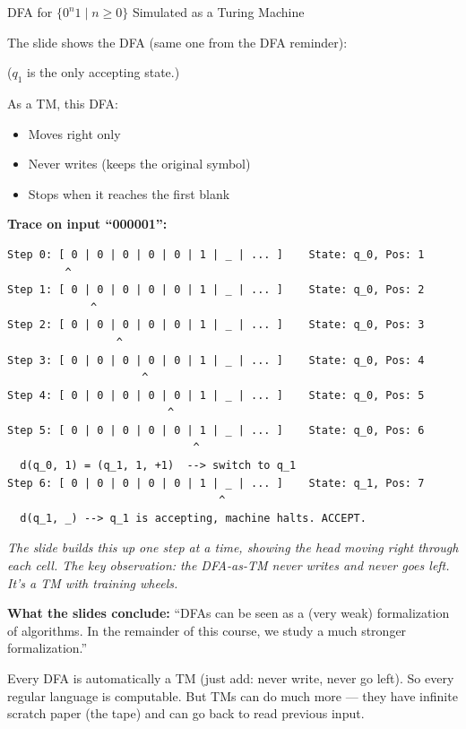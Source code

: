 \documentclass[11pt,a4paper]{article}
\newcommand{\kt}[1]{\par\vspace{0.3em}\colorbox{yellow!60}{\parbox{\dimexpr\linewidth-2\fboxsep}{#1}}\vspace{0.3em}}
\begin{document}
\begin{examplebox}{DFA for $\{0^n 1 \mid n \geq 0\}$ Simulated as a Turing Machine}

The slide shows the DFA (same one from the DFA reminder):
\begin{center}
\end{center}
($q_1$ is the only accepting state.)

As a TM, this DFA:
\begin{itemize}[nosep]
\item Moves right only
\item Never writes (keeps the original symbol)
\item Stops when it reaches the first blank
\end{itemize}

\textbf{Trace on input ``000001'':}

\begin{lstlisting}
Step 0: [ 0 | 0 | 0 | 0 | 0 | 1 | _ | ... ]    State: q_0, Pos: 1
         ^
Step 1: [ 0 | 0 | 0 | 0 | 0 | 1 | _ | ... ]    State: q_0, Pos: 2
             ^
Step 2: [ 0 | 0 | 0 | 0 | 0 | 1 | _ | ... ]    State: q_0, Pos: 3
                 ^
Step 3: [ 0 | 0 | 0 | 0 | 0 | 1 | _ | ... ]    State: q_0, Pos: 4
                     ^
Step 4: [ 0 | 0 | 0 | 0 | 0 | 1 | _ | ... ]    State: q_0, Pos: 5
                         ^
Step 5: [ 0 | 0 | 0 | 0 | 0 | 1 | _ | ... ]    State: q_0, Pos: 6
                             ^
  d(q_0, 1) = (q_1, 1, +1)  --> switch to q_1
Step 6: [ 0 | 0 | 0 | 0 | 0 | 1 | _ | ... ]    State: q_1, Pos: 7
                                 ^
  d(q_1, _) --> q_1 is accepting, machine halts. ACCEPT.
\end{lstlisting}

\textit{The slide builds this up one step at a time, showing the head moving right through each cell. The key observation: the DFA-as-TM never writes and never goes left. It's a TM with training wheels.}

\textbf{What the slides conclude:} ``DFAs can be seen as a (very weak) formalization of algorithms. In the remainder of this course, we study a much stronger formalization.''

\kt{Every DFA is automatically a TM (just add: never write, never go left). So every regular language is computable. But TMs can do much more --- they have infinite scratch paper (the tape) and can go back to read previous input.}
\end{examplebox}
\end{document}
